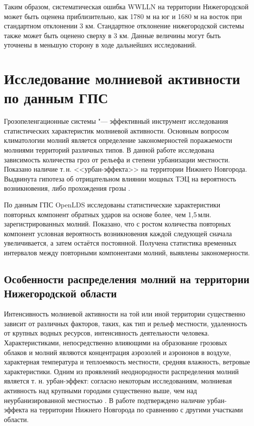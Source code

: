 Таким образом, систематическая ошибка WWLLN на территории Нижегородской может быть оценена приблизительно, как 1780 м на юг и 1680 м на восток при стандартном отклонении 3 км. Стандартное отклонение нижегородской системы также может быть оценено сверху в 3 км. Данные величины могут быть уточнены в меньшую сторону в ходе дальнейших исследований.

\chapter{Исследование молниевой активности по данным ГПС}
Грозопеленгационные системы "--- эффективный инструмент исследования статистических характеристик молниевой активности. Основным вопросом климатологии молний является определение закономерностей поражаемости молниями территорий различных типов. В данной работе исследована зависимость количества гроз от рельефа и степени урбанизации местности. Показано наличие т.\,н. <<урбан-эффекта>> на территории Нижнего Новгорода. Выдвинута гипотеза об отрицательном влиянии мощных ТЭЦ на вероятность возникновения, либо прохождения грозы \cite{BulatovEnergetik2017}. 

По данным ГПС OpenLDS исследованы статистические характеристики повторных компонент обратных ударов на основе более, чем 1,5\,млн. зарегистрированных молний. Показано, что с ростом количества повторных компонент условная вероятность возникновения каждой следующей сначала увеличивается, а затем остаётся постоянной. Получена статистика временных интервалов между повторными компонентами молний, выявлены закономерности.

\section{Особенности распределения молний на территории Нижегородской области}
\label{sec:lds-distr}
Интенсивность молниевой активности на той или иной территории существенно зависит от различных факторов, таких, как тип и рельеф местности, удаленность от крупных водных ресурсов, интенсивность деятельности человека. Характеристиками, непосредственно влияющими на образование грозовых облаков и молний являются концентрация аэрозолей и аэроионов в воздухе, характерная температура и теплоемкость местности, средняя влажность, ветровые характеристики. Одним из проявлений неоднородности распределения молний является т. н. урбан-эффект: согласно некоторым исследованиям, молниевая активность над крупными городами существенно выше, чем над неурбанизированной местностью \cite{Farias2009,Farias2014,Pinto2004}. В работе \cite{BulatovMiG} подтверждено наличие урбан-эффекта на территории Нижнего Новгорода по сравнению с другими участками области.


